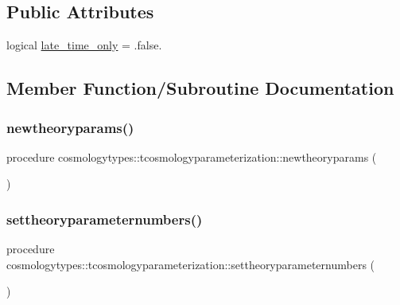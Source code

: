 \subsection*{Public Attributes}
\begin{DoxyCompactItemize}
\item 
logical \mbox{\hyperlink{structcosmologytypes_1_1tcosmologyparameterization_ad7eef04da8966b4362c7c8611a66dc38}{late\+\_\+time\+\_\+only}} = .false.
\end{DoxyCompactItemize}


\subsection{Member Function/\+Subroutine Documentation}
\mbox{\label{structcosmologytypes_1_1tcosmologyparameterization_a72f2f32078a59a9b02baffb5a3178f6e}} 
\subsubsection{\texorpdfstring{newtheoryparams()}{newtheoryparams()}}
{\footnotesize\ttfamily procedure cosmologytypes\+::tcosmologyparameterization\+::newtheoryparams (\begin{DoxyParamCaption}{ }\end{DoxyParamCaption})}

\mbox{\label{structcosmologytypes_1_1tcosmologyparameterization_a33d6f6bd2a8720e134a5b6ceeac9a716}} 
\subsubsection{\texorpdfstring{settheoryparameternumbers()}{settheoryparameternumbers()}}
{\footnotesize\ttfamily procedure cosmologytypes\+::tcosmologyparameterization\+::settheoryparameternumbers (\begin{DoxyParamCaption}{ }\end{DoxyParamCaption})}



